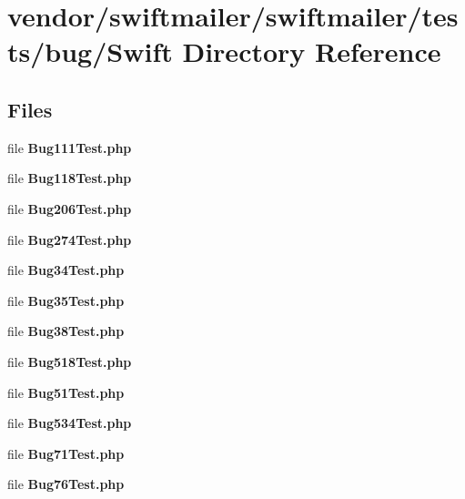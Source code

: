 \section{vendor/swiftmailer/swiftmailer/tests/bug/\+Swift Directory Reference}
\label{dir_0355b703952906fada49496289f3d149}
\subsection*{Files}
\begin{DoxyCompactItemize}
\item 
file {\bf Bug111\+Test.\+php}
\item 
file {\bf Bug118\+Test.\+php}
\item 
file {\bf Bug206\+Test.\+php}
\item 
file {\bf Bug274\+Test.\+php}
\item 
file {\bf Bug34\+Test.\+php}
\item 
file {\bf Bug35\+Test.\+php}
\item 
file {\bf Bug38\+Test.\+php}
\item 
file {\bf Bug518\+Test.\+php}
\item 
file {\bf Bug51\+Test.\+php}
\item 
file {\bf Bug534\+Test.\+php}
\item 
file {\bf Bug71\+Test.\+php}
\item 
file {\bf Bug76\+Test.\+php}
\end{DoxyCompactItemize}
